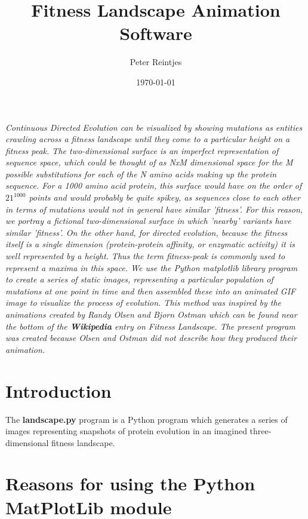 \documentclass[10pt,letterpaper]{article}
\date{}
\begin{document}
\title{Fitness Landscape Animation Software}
\author{Peter Reintjes}
\date{\today}
\maketitle

\vspace*{0.2in}
\begin{flushleft}
\texttt{[image: \{fitness]}.png}
\end{flushleft}

{\it Continuous Directed Evolution can be visualized by showing mutations as entities crawling across a fitness landscape until they come to a particular height on a fitness peak.  The two-dimensional surface is an imperfect representation of sequence space, which could be thought of as NxM dimensional space for the M possible substitutions for each of the N amino acids making up the protein sequence.  For a 1000 amino acid protein, this surface would have on the order of $21^{1000}$ points and would probably be quite spikey, as sequences close to each other in terms of mutations would not in general have similar 'fitness'.  For this reason, we portray a fictional two-dimensional surface in which 'nearby' variants have similar 'fitness'.  On the other hand, for directed evolution, because the fitness itself is a single dimension (protein-protein affinity, or enzymatic activity) it is well represented by a height.  Thus the term fitness-peak is commonly used to represent a maxima in this space.  We use the Python matplotlib library\cite{matplotlib} program to create a series of static images, representing a particular population of mutations at one point in time and then assembled these into an animated GIF image to visualize the process of evolution.  This method was inspired by the animations created by Randy Olsen and Bjorn Ostman which can be found near the bottom of the {\bf Wikipedia} entry on Fitness Landscape\cite{fitness}. The present program was created because Olsen and Ostman did not describe how they produced their animation.}

\section*{Introduction}

The {\bf landscape.py} program is a Python program which generates a series of images representing snapshots of protein evolution in an imagined three-dimensional fitness landscape.

\section*{Reasons for using the Python MatPlotLib module}
\end{document}
